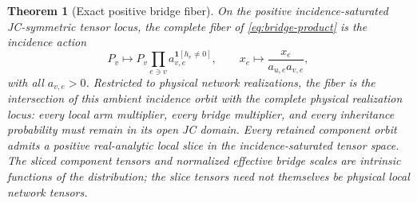 \documentclass[11pt]{article}
\newtheorem{theorem}{Theorem}[section]
\theoremstyle{remark}
\begin{document}
\begin{theorem}[Exact positive bridge fiber]\label{thm:bridge-fiber}
On the positive incidence-saturated JC-symmetric tensor locus, the complete
fiber of
\eqref{eq:bridge-product} is the incidence action
\begin{equation}\label{eq:incidence}
P_v\longmapsto P_v\prod_{e\ni v}a_{v,e}^{\mathbf1[h_e\ne0]},
\qquad
x_e\longmapsto\frac{x_e}{a_{u,e}a_{v,e}},
\end{equation}
with all $a_{v,e}>0$.  Restricted to physical network realizations, the fiber
is the intersection of this ambient incidence orbit with the \emph{complete}
physical realization locus: every local arm multiplier, every bridge
multiplier, and every inheritance probability must remain in its open JC
domain.
Every retained component orbit admits a positive real-analytic local slice
in the incidence-saturated tensor space.  The sliced component tensors and
normalized effective bridge scales are intrinsic functions of the
distribution; the slice tensors need not themselves be physical local
network tensors.
\end{theorem}
\end{document}
